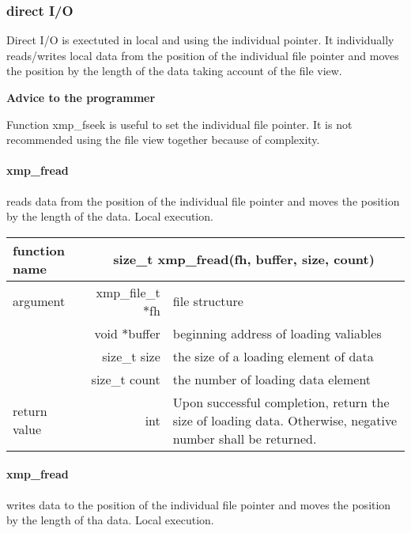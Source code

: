    \subsubsection{direct I/O}

   Direct I/O is exectuted in local and using the individual pointer. 
   It individually reads/writes local data
   from the position of the individual file pointer and 
   moves the position by the length of the data taking account of the file view.

   {\bf Advice to the programmer}

   Function xmp\_fseek is useful to set the individual file pointer.
   It is not recommended using the file view together because of complexity.

   \paragraph{ xmp\_fread} reads data from the position of the individual file
   pointer and moves the position by the length of the data.
   Local execution.

   \begin{table}[h]
    \begin{center}
     \begin{tabular}{|l|r|p{80mm}|}
      \hline
      {\bf function name}  & \multicolumn{2}{c|}{\bf size\_t
      xmp\_fread(fh, buffer, size, count)} \\ \hline \hline
      argument & xmp\_file\_t $*$fh & file structure \\ \cline{2-3}
      & void $*$buffer & beginning address of loading valiables \\ \cline{2-3}
      & size\_t size & the size of a loading element of data \\ \cline{2-3}
      & size\_t count & the number of loading data element \\ \hline
      return value & int & Upon successful completion, return the size
	      of loading data. Otherwise, negative number shall be
	      returned. \\ \hline
      \end{tabular}
     \end{center}
    \label{tb:aaa}
   \end{table}

   \paragraph{ xmp\_fread} writes data to the position of the individual file
   pointer and moves the position by the length of tha data.
   Local execution.

